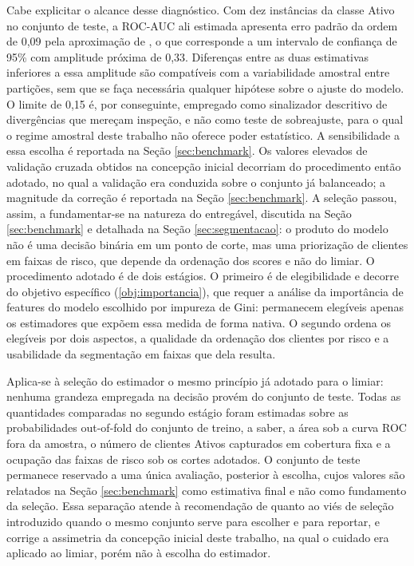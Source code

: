 Cabe explicitar o alcance desse diagnóstico. Com dez instâncias da classe Ativo no conjunto de teste, a ROC-AUC ali estimada apresenta erro padrão da ordem de 0,09 pela aproximação de , o que corresponde a um intervalo de confiança de 95\% com amplitude próxima de 0,33. Diferenças entre as duas estimativas inferiores a essa amplitude são compatíveis com a variabilidade amostral entre partições, sem que se faça necessária qualquer hipótese sobre o ajuste do modelo. O limite de 0,15 é, por conseguinte, empregado como sinalizador descritivo de divergências que mereçam inspeção, e não como teste de sobreajuste, para o qual o regime amostral deste trabalho não oferece poder estatístico. A sensibilidade a essa escolha é reportada na Seção \ref{sec:benchmark}. Os valores elevados de validação cruzada obtidos na concepção inicial decorriam do procedimento então adotado, no qual a validação era conduzida sobre o conjunto já balanceado; a magnitude da correção é reportada na Seção \ref{sec:benchmark}. A seleção passou, assim, a fundamentar-se na natureza do entregável, discutida na Seção \ref{sec:benchmark} e detalhada na Seção \ref{sec:segmentacao}: o produto do modelo não é uma decisão binária em um ponto de corte, mas uma priorização de clientes em faixas de risco, que depende da ordenação dos scores e não do limiar. O procedimento adotado é de dois estágios. O primeiro é de elegibilidade e decorre do objetivo específico (\ref{obj:importancia}), que requer a análise da importância de features do modelo escolhido por impureza de Gini: permanecem elegíveis apenas os estimadores que expõem essa medida de forma nativa. O segundo ordena os elegíveis por dois aspectos, a qualidade da ordenação dos clientes por risco e a usabilidade da segmentação em faixas que dela resulta.

Aplica-se à seleção do estimador o mesmo princípio já adotado para o limiar: nenhuma grandeza empregada na decisão provém do conjunto de teste. Todas as quantidades comparadas no segundo estágio foram estimadas sobre as probabilidades out-of-fold do conjunto de treino, a saber, a área sob a curva ROC fora da amostra, o número de clientes Ativos capturados em cobertura fixa e a ocupação das faixas de risco sob os cortes adotados. O conjunto de teste permanece reservado a uma única avaliação, posterior à escolha, cujos valores são relatados na Seção \ref{sec:benchmark} como estimativa final e não como fundamento da seleção. Essa separação atende à recomendação de  quanto ao viés de seleção introduzido quando o mesmo conjunto serve para escolher e para reportar, e corrige a assimetria da concepção inicial deste trabalho, na qual o cuidado era aplicado ao limiar, porém não à escolha do estimador.


